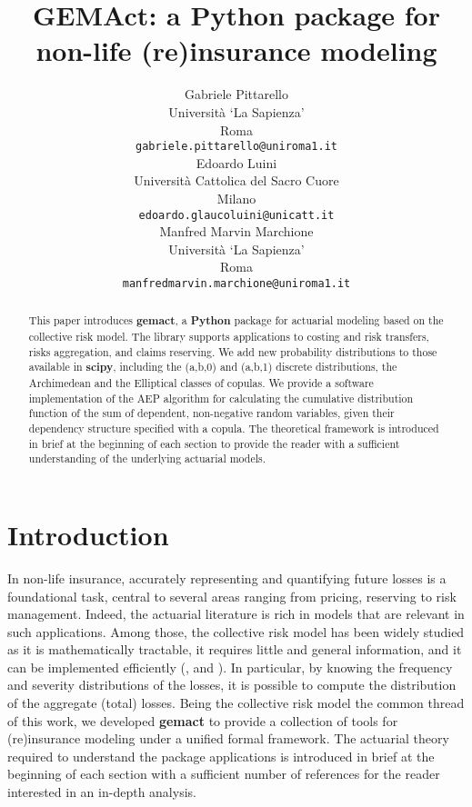 \documentclass{article}
\title{GEMAct: a Python package for non-life (re)insurance modeling
}
\author{
  Gabriele Pittarello \\
  Universit\`{a} `La Sapienza'\\
  Roma\\
  \texttt{gabriele.pittarello@uniroma1.it} \\
   \And
 Edoardo Luini\\
 Universit\`{a} Cattolica del Sacro Cuore\\
  Milano\\
  \texttt{edoardo.glaucoluini@unicatt.it} \\
     \And
  Manfred Marvin Marchione\\
 Universit\`{a} `La Sapienza'\\
  Roma\\
  \texttt{manfredmarvin.marchione@uniroma1.it} \\
}
\begin{document}
\maketitle

\begin{abstract}
This paper introduces \textbf{gemact}, a \textbf{Python} package for actuarial modeling based on the collective risk model. The library supports applications to costing and risk transfers, risks aggregation, and claims reserving. We add new probability distributions to those available in \textbf{scipy}, including the (a,b,0) and (a,b,1) discrete distributions, the Archimedean and the Elliptical classes of copulas.
We provide a software implementation of the AEP algorithm for calculating the cumulative distribution function of the sum of dependent, non-negative random variables, given their dependency structure specified with a copula. The theoretical framework is introduced in brief at the beginning of each section to provide the reader with a sufficient understanding of the underlying actuarial models.
\end{abstract}



\section[Introduction]{Introduction} \label{sec:intro}

In non-life insurance, accurately representing and quantifying future losses is a foundational task, central to several areas ranging from pricing, reserving to risk management. Indeed, the actuarial literature is rich in models that are relevant in such applications. Among those, the collective risk model has been widely studied as it is mathematically tractable, it requires little and general information, and it can be implemented efficiently (\cite{klugman98}, \cite{embrechts09} and \cite{parodi14}). In particular, by knowing the frequency and severity distributions of the losses, it is possible to compute the distribution of the aggregate (total) losses.
Being the collective risk model the common thread of this work, we developed \textbf{gemact} to provide a collection of tools for (re)insurance modeling under a unified formal framework. The actuarial theory required to understand the package applications is introduced in brief at the beginning of each section with a sufficient number of references for the reader interested in an in-depth analysis.
\end{document}
